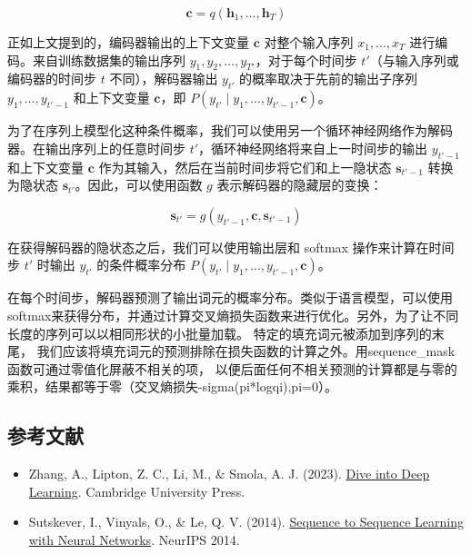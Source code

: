\[
\mathbf{c} = q(\mathbf{h}_1,\ldots,\mathbf{h}_T)
\]

正如上文提到的，编码器输出的上下文变量 \(\mathbf{c}\) 对整个输入序列 \(x_1,\ldots,x_T\) 进行编码。来自训练数据集的输出序列 \(y_1,y_2,\ldots,y_{T'}\)，对于每个时间步 \(t'\)（与输入序列或编码器的时间步 \(t\) 不同），解码器输出 \(y_{t'}\) 的概率取决于先前的输出子序列 \(y_1,\ldots,y_{t'-1}\) 和上下文变量 \(\mathbf{c}\)，即 \(P(y_{t'} \mid y_1,\ldots,y_{t'-1},\mathbf{c})\)。

为了在序列上模型化这种条件概率，我们可以使用另一个循环神经网络作为解码器。在输出序列上的任意时间步 \(t'\)，循环神经网络将来自上一时间步的输出 \(y_{t'-1}\) 和上下文变量 \(\mathbf{c}\) 作为其输入，然后在当前时间步将它们和上一隐状态 \(\mathbf{s}_{t'-1}\) 转换为隐状态 \(\mathbf{s}_{t'}\)。因此，可以使用函数 \(g\) 表示解码器的隐藏层的变换：

\[
\mathbf{s}_{t'} = g(y_{t'-1},\mathbf{c},\mathbf{s}_{t'-1})
\]

在获得解码器的隐状态之后，我们可以使用输出层和 softmax 操作来计算在时间步 \(t'\) 时输出 \(y_{t'}\) 的条件概率分布 \(P(y_{t'} \mid y_1,\ldots,y_{t'-1},\mathbf{c})\)。

在每个时间步，解码器预测了输出词元的概率分布。类似于语言模型，可以使用softmax来获得分布，并通过计算交叉熵损失函数来进行优化。另外，为了让不同长度的序列可以以相同形状的小批量加载。 特定的填充词元被添加到序列的末尾， 我们应该将填充词元的预测排除在损失函数的计算之外。用sequence\_mask函数可通过零值化屏蔽不相关的项， 以便后面任何不相关预测的计算都是与零的乘积，结果都等于零（交叉熵损失-sigma(pi*logqi),pi=0）。

\hypertarget{ux53c2ux8003ux6587ux732e-24}{%
\subsection{参考文献}\label{ux53c2ux8003ux6587ux732e-24}}

\vspace{0.25em}
\begin{itemize}
\tightlist
\item
  Zhang, A., Lipton, Z. C., Li, M., \& Smola, A. J. (2023). \href{https://D2L.ai}{Dive into Deep Learning}. Cambridge University Press.
\item
  Sutskever, I., Vinyals, O., \& Le, Q. V. (2014). \href{https://proceedings.neurips.cc/paper_files/paper/2014/hash/5a18e133cbf9f257297f410bb7eca942-Abstract.html}{Sequence to Sequence Learning with Neural Networks}. NeurIPS 2014.
\end{itemize}

\clearpage
